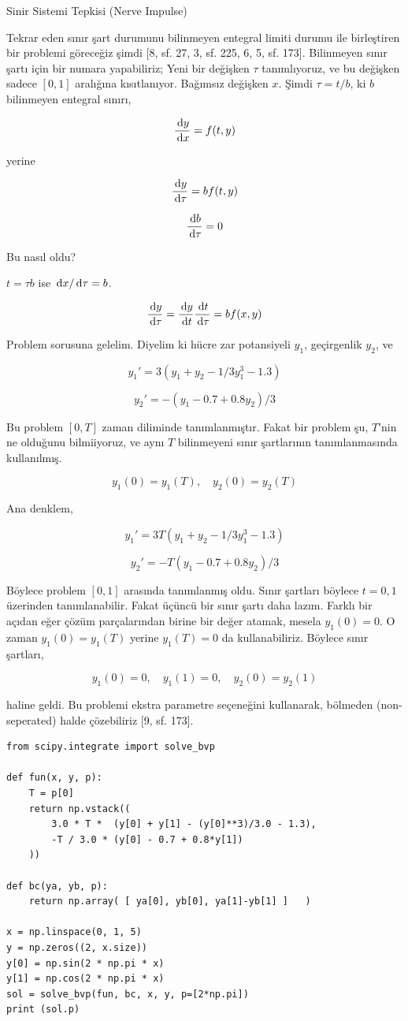\documentclass[12pt,fleqn]{article}\usepackage{../../common}
\begin{document}
Sinir Sistemi Tepkisi (Nerve Impulse)

Tekrar eden sınır şart durumunu bilinmeyen entegral limiti durumu ile
birleştiren bir problemi göreceğiz şimdi [8, sf. 27, 3, sf. 225, 6, 5,
sf. 173]. Bilinmeyen sınır şartı için bir numara yapabiliriz; Yeni bir
değişken $\tau$ tanımlıyoruz, ve bu değişken sadece $[0,1]$ aralığına
kısıtlanıyor. Bağımsız değişken $x$.  Şimdi $\tau = t/b$, ki $b$
bilinmeyen entegral sınırı,

$$
\frac{\,\mathrm{d} y}{\,\mathrm{d} x} = f(t,y)
$$

yerine 

$$
\frac{\,\mathrm{d} y}{\,\mathrm{d} \tau} = b f(t,y)
$$

$$
\frac{\,\mathrm{d} b}{\,\mathrm{d} \tau} = 0
$$

Bu nasıl oldu? 

$t = \tau b$ ise $\,\mathrm{d} x / \,\mathrm{d} \tau = b$. 

$$
\frac{\,\mathrm{d} y}{\,\mathrm{d} \tau} = \frac{\,\mathrm{d} y}{\,\mathrm{d} t} \frac{\,\mathrm{d} t}{\,\mathrm{d} \tau} = 
b f(x,y)
$$

Problem sorusuna gelelim. Diyelim ki hücre zar potansiyeli $y_1$,
geçirgenlik $y_2$, ve

$$
y_1' = 3 (y_1 + y_2 - 1/3 y_1^3 - 1.3)
$$

$$
y_2' = -(y_1 - 0.7 + 0.8 y_2) / 3
$$

Bu problem $[0,T]$ zaman diliminde tanımlanmıştır. Fakat bir problem
şu, $T$'nin ne olduğunu bilmiiyoruz, ve aynı $T$ bilinmeyeni sınır
şartlarının tanımlanmasında kullanılmış.  

$$
y_1(0) = y_1(T), \quad y_2(0) = y_2(T)
$$

Ana denklem,

$$
y_1' = 3 T (y_1 + y_2 - 1/3 y_1^3 - 1.3)
$$

$$
y_2' = -T (y_1 - 0.7 + 0.8 y_2) / 3
$$
 
Böylece problem $[0,1]$ arasında tanımlanmış oldu.  Sınır şartları böylece
$t=0,1$ üzerinden tanımlanabilir. Fakat üçüncü bir sınır şartı daha
lazım. Farklı bir açıdan eğer çözüm parçalarından birine bir değer atamak,
mesela $y_1(0) = 0$. O zaman $y_1(0) = y_1(T)$ yerine $y_1(T)=0$ da
kullanabiliriz. Böylece sınır şartları,

$$
y_1(0) = 0, \quad y_1(1) = 0, \quad y_2(0) = y_2(1)
$$

haline geldi. Bu problemi ekstra parametre seçeneğini kullanarak, bölmeden
(non-seperated) halde çözebiliriz [9, sf. 173]. 

\begin{verbatim}
from scipy.integrate import solve_bvp

def fun(x, y, p):
    T = p[0]
    return np.vstack((
        3.0 * T *  (y[0] + y[1] - (y[0]**3)/3.0 - 1.3),
        -T / 3.0 * (y[0] - 0.7 + 0.8*y[1]) 
    ))

def bc(ya, yb, p):
    return np.array( [ ya[0], yb[0], ya[1]-yb[1] ]   )
                     
x = np.linspace(0, 1, 5)
y = np.zeros((2, x.size))
y[0] = np.sin(2 * np.pi * x)
y[1] = np.cos(2 * np.pi * x)
sol = solve_bvp(fun, bc, x, y, p=[2*np.pi])
print (sol.p)
\end{verbatim}
\end{document}
